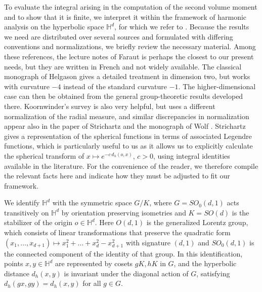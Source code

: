 \documentclass[11pt,a4paper]{article}
\theoremstyle{plain}
\theoremstyle{definition}
\theoremstyle{remark}
\def\HH{\mathbb{H}}
\begin{document}
To evaluate the integral arising in the computation of the second volume moment and to show that it is finite, we interpret it within the framework of harmonic analysis on the hyperbolic space $\HH^d$, for which we refer to \cite{Faraut,Helgason,Koornwinder,Strichartz,Wolf}. Because the results we need are distributed over several sources and formulated with differing conventions and normalizations, we briefly review the necessary material. Among these references, the lecture notes \cite{Faraut} of Faraut is perhaps the closest to our present needs, but they are written in French and not widely available. The classical monograph of Helgason \cite{Helgason} gives a detailed treatment in dimension two, but works with curvature $-4$ instead of the standard curvature $-1$. The higher-dimensional case can then be obtained from the general group-theoretic results developed there. Koornwinder's survey \cite{Koornwinder} is also very helpful, but uses a different normalization of the radial measure, and similar discrepancies in normalization appear also in the paper of Strichartz \cite{Strichartz} and the monograph of Wolf \cite{Wolf}. Strichartz gives a representation of the spherical functions in terms of associated Legendre functions, which is particularly useful to us as it allows us to explicitly calculate the spherical transform of $x \mapsto e^{-c \, d_h(o,x)}$, $c>0$, using integral identities available in the literature. For the convenience of the reader, we therefore compile the relevant facts here and indicate how they must be adjusted to fit our framework.

We identify $\HH^d$ with the symmetric space $G/K$, where $G = SO_0(d,1)$ acts transitively on $\HH^d$ by orientation preserving isometries and $K = SO(d)$ is the stabilizer of the origin $o \in \HH^d$. Here $O(d,1)$ is the generalized Lorentz group, which consists of linear transformations that preserve the quadratic form $(x_1,\ldots,x_{d+1})\mapsto x_1^2+\ldots+x_d^2-x_{d+1}^2$ with signature $(d,1)$ and $SO_0(d,1)$ is the connected component of the identity of that group. In this identification, points $x, y \in \HH^d$ are represented by cosets $gK, hK$ in $G$, and the hyperbolic distance $d_h(x,y)$ is invariant under the diagonal action of $G$, satisfying $d_h(gx, gy) = d_h(x,y)$ for all $g \in G$.
\end{document}
